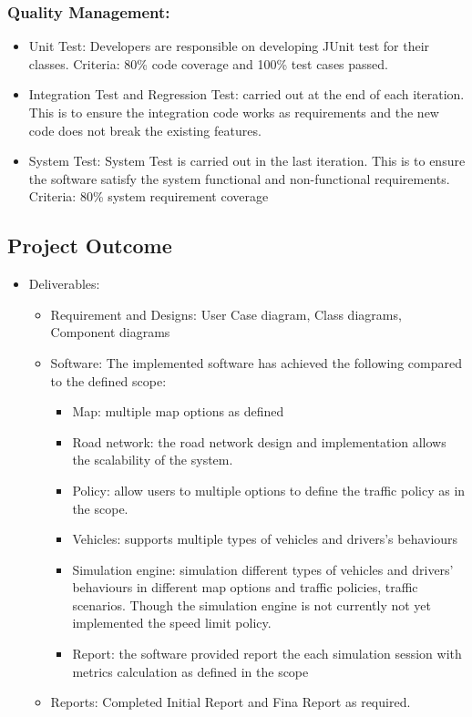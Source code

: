 \documentclass[11pt]{article}
\begin{document}
	\subsubsection{Quality Management: } 
	\begin{itemize}
    \item Unit Test: Developers are responsible on developing JUnit test for their classes. Criteria: 80\% code coverage and 100\% test cases passed. 
    \item Integration Test and Regression Test: carried out at the end of each iteration. This is to ensure the integration code works as requirements and the new code does not break the existing features. 
    \item System Test: System Test is carried out in the last iteration. This is to ensure the software satisfy the system functional and non-functional requirements. Criteria: 80\% system requirement coverage
	\end{itemize}
	
	



\subsection{Project Outcome}
\begin{itemize}
\item Deliverables:
\begin{itemize}
    \item Requirement and Designs: User Case diagram, Class diagrams, Component diagrams 
    
    \item Software: The implemented software has achieved the following compared to the defined scope:
    \begin{itemize}
    \item Map: multiple map options as defined
    \item Road network: the road network design and implementation allows the scalability of the system.  
    \item Policy: allow users to multiple options to define the traffic policy as in the scope. 
    \item Vehicles: supports multiple types of vehicles and drivers's behaviours 
    \item Simulation engine: simulation different types of vehicles and drivers' behaviours in different map options and traffic policies, traffic scenarios. Though the simulation engine is not currently not yet implemented the speed limit policy.
    \item Report: the software provided report the each simulation session with metrics calculation as defined in the scope

    
    \end{itemize}
    \item Reports: Completed Initial Report and Fina Report as required. 
\end{itemize}


\end{itemize}
\end{document}
